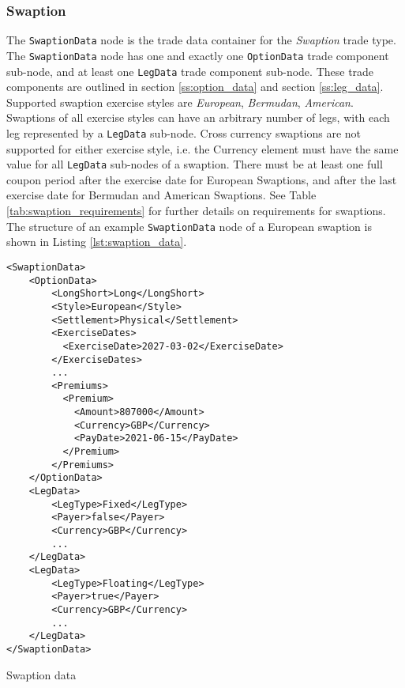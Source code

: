 \subsubsection{Swaption}
\label{ss:swaption} 

The \lstinline!SwaptionData!  node is the trade data container for the \emph{Swaption} trade type. The \lstinline!SwaptionData!
node has one and exactly one \lstinline!OptionData! trade component sub-node, and at least one \lstinline!LegData! trade
component sub-node.  These trade components are outlined in section \ref{ss:option_data} and section
\ref{ss:leg_data}.\\
\vspace{5mm}
Supported swaption exercise styles are \emph{European}, \emph{Bermudan}, \emph{American}. Swaptions of all exercise styles can have an arbitrary number of legs, with
each leg represented by a \lstinline!LegData! sub-node.  Cross currency swaptions are not supported for either exercise style, i.e. the Currency element must
have the same value for all \lstinline!LegData! sub-nodes of a swaption. There must be at least one full coupon period after the exercise date for European 
Swaptions, and after the last exercise date for Bermudan and American Swaptions. See Table \ref{tab:swaption_requirements} for further details on requirements for
 swaptions.\\
\vspace{5mm}
The structure of an example \lstinline!SwaptionData!  node of a European swaption is shown in Listing
\ref{lst:swaption_data}.

\begin{listing}[H]
\begin{verbatim}
<SwaptionData>
    <OptionData>
        <LongShort>Long</LongShort>
        <Style>European</Style>
        <Settlement>Physical</Settlement>
        <ExerciseDates>
          <ExerciseDate>2027-03-02</ExerciseDate>
        </ExerciseDates>
        ...
        <Premiums>
          <Premium>
            <Amount>807000</Amount>
            <Currency>GBP</Currency>
            <PayDate>2021-06-15</PayDate>
          </Premium>
        </Premiums>
    </OptionData>
    <LegData>
        <LegType>Fixed</LegType>
        <Payer>false</Payer>    
        <Currency>GBP</Currency>
        ...
    </LegData>
    <LegData>
        <LegType>Floating</LegType>
        <Payer>true</Payer>     
        <Currency>GBP</Currency>
        ...
    </LegData>
</SwaptionData>
\end{verbatim}
\caption{Swaption data}
\label{lst:swaption_data}
\end{listing}

